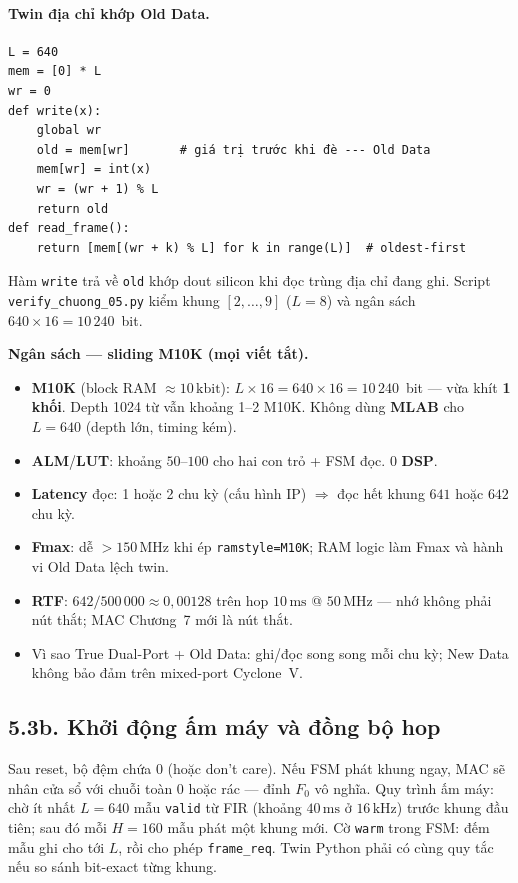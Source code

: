 \paragraph{Twin địa chỉ khớp Old Data.}
\begin{verbatim}
L = 640
mem = [0] * L
wr = 0
def write(x):
    global wr
    old = mem[wr]       # giá trị trước khi đè --- Old Data
    mem[wr] = int(x)
    wr = (wr + 1) % L
    return old
def read_frame():
    return [mem[(wr + k) % L] for k in range(L)]  # oldest-first
\end{verbatim}
Hàm \texttt{write} trả về \texttt{old} khớp dout silicon khi đọc trùng địa chỉ đang ghi.
Script \texttt{verify\_chuong\_05.py} kiểm khung $[2,\ldots,9]$ ($L=8$)
và ngân sách $640\times 16=10\,240$~bit.

\begin{costbox}
\textbf{Ngân sách --- sliding M10K (mọi viết tắt).}
\begin{itemize}[leftmargin=1.2em]
\item \textbf{M10K} (block RAM $\approx 10\,\text{kbit}$): $L\times 16=640\times 16=10\,240$~bit --- vừa khít \textbf{1 khối}. Depth 1024 từ vẫn khoảng 1--2 M10K. Không dùng \textbf{MLAB} cho $L=640$ (depth lớn, timing kém).
\item \textbf{ALM}/\textbf{LUT}: khoảng $50$--$100$ cho hai con trỏ + FSM đọc. 0 \textbf{DSP}.
\item \textbf{Latency} đọc: 1 hoặc 2 chu kỳ (cấu hình IP) $\Rightarrow$ đọc hết khung $641$ hoặc $642$ chu kỳ.
\item \textbf{Fmax}: dễ $>150\,\text{MHz}$ khi ép \texttt{ramstyle=M10K}; RAM logic làm Fmax và hành vi Old Data lệch twin.
\item \textbf{RTF}: $642/500\,000\approx 0{,}00128$ trên hop $10\,\text{ms}$ @ $50\,\text{MHz}$ --- nhớ không phải nút thắt; MAC Chương~7 mới là nút thắt.
\item Vì sao True Dual-Port + Old Data: ghi/đọc song song mỗi chu kỳ; New Data không bảo đảm trên mixed-port Cyclone~V.
\end{itemize}
\end{costbox}


\subsection*{5.3b. Khởi động ấm máy và đồng bộ hop}

Sau reset, bộ đệm chứa $0$ (hoặc don't care). Nếu FSM phát khung ngay, MAC sẽ nhân cửa sổ với chuỗi toàn 0 hoặc rác --- đỉnh $F_0$ vô nghĩa. Quy trình ấm máy: chờ ít nhất $L=640$ mẫu \texttt{valid} từ FIR (khoảng $40\,\text{ms}$ ở $16\,\text{kHz}$) trước khung đầu tiên; sau đó mỗi $H=160$ mẫu phát một khung mới. Cờ \texttt{warm} trong FSM: đếm mẫu ghi cho tới $L$, rồi cho phép \texttt{frame\_req}. Twin Python phải có cùng quy tắc nếu so sánh bit-exact từng khung.


